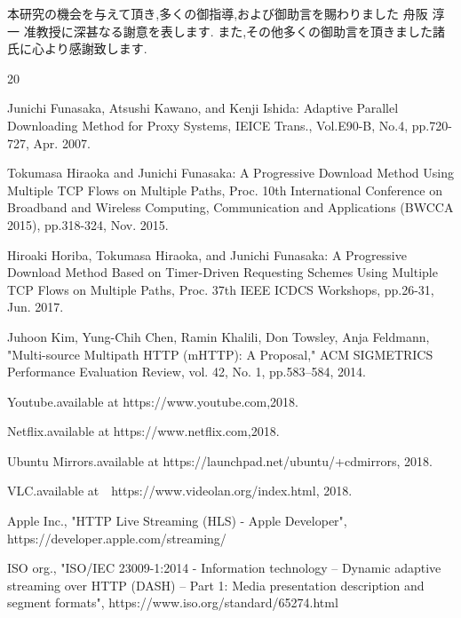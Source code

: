 \documentclass[a4j,12pt]{gradthesis_utf8}
\begin{document}
\clearpage
%
\begin{acknowledgment}
 本研究の機会を与えて頂き,多くの御指導,および御助言を賜わりました
舟阪 淳一 准教授に深甚なる謝意を表します.
また,その他多くの御助言を頂きました諸氏に心より感謝致します.
\end{acknowledgment}
\begin {thebibliography}{20} 

Junichi Funasaka, Atsushi Kawano, and Kenji Ishida: Adaptive Parallel Downloading Method for Proxy Systems, IEICE Trans., Vol.E90-B, No.4, pp.720-727, Apr. 2007.

Tokumasa Hiraoka and Junichi Funasaka: A Progressive Download Method Using Multiple TCP Flows on Multiple Paths, Proc. 10th International Conference on Broadband and Wireless Computing, Communication and Applications (BWCCA 2015), pp.318-324, Nov. 2015. 

Hiroaki Horiba, Tokumasa Hiraoka, and Junichi Funasaka: A Progressive Download Method Based on Timer-Driven Requesting Schemes Using Multiple TCP Flows on Multiple Paths, Proc. 37th IEEE ICDCS Workshops, pp.26-31, Jun. 2017.

Juhoon Kim, Yung-Chih Chen, Ramin Khalili, Don Towsley, Anja Feldmann,
"Multi-source Multipath HTTP (mHTTP): A Proposal,"
ACM SIGMETRICS Performance Evaluation Review, vol. 42, No. 1, pp.583--584, 2014.

Youtube.available at https://www.youtube.com,2018.

Netflix.available at https://www.netflix.com,2018.

Ubuntu Mirrors.available at https://launchpad.net/ubuntu/+cdmirrors, 2018.

VLC.available at　https://www.videolan.org/index.html, 2018.

Apple Inc., "HTTP Live Streaming (HLS) - Apple Developer", https://developer.apple.com/streaming/

ISO org., "ISO/IEC 23009-1:2014 - Information technology -- Dynamic adaptive streaming over HTTP (DASH) -- Part 1: Media presentation description and segment formats", https://www.iso.org/standard/65274.html

\end {thebibliography}
\end{document}
